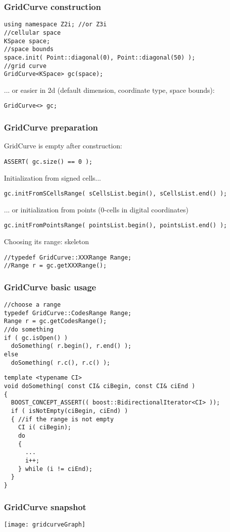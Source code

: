 
\begin{frame}[containsverbatim]
  \frametitle{GridCurve construction}

  \begin{lstlisting}
using namespace Z2i; //or Z3i
//cellular space
KSpace space;                 
//space bounds
space.init( Point::diagonal(0), Point::diagonal(50) );
//grid curve 
GridCurve<KSpace> gc(space); 
  \end{lstlisting}
... or easier in 2d (default dimension, coordinate type, space bounds): 
  \begin{lstlisting}
GridCurve<> gc; 
  \end{lstlisting}

\end{frame}


\begin{frame}[containsverbatim]
  \frametitle{GridCurve preparation}

GridCurve is empty after construction: 
  \begin{lstlisting}
ASSERT( gc.size() == 0 ); 
  \end{lstlisting}

Initialization from signed cells... 
  \begin{lstlisting}
gc.initFromSCellsRange( sCellsList.begin(), sCellsList.end() ); 
  \end{lstlisting}

... or initialization from points ($0$-cells in digital coordinates)
  \begin{lstlisting}
gc.initFromPointsRange( pointsList.begin(), pointsList.end() ); 
  \end{lstlisting}

Choosing its range: skeleton 
  \begin{lstlisting}
//typedef GridCurve::XXXRange Range; 
//Range r = gc.getXXXRange();
  \end{lstlisting}


\end{frame}

\begin{frame}[containsverbatim]
  \frametitle{GridCurve basic usage}

  \begin{lstlisting}
//choose a range
typedef GridCurve::CodesRange Range; 
Range r = gc.getCodesRange();
//do something 
if ( gc.isOpen() ) 
  doSomething( r.begin(), r.end() ); 
else 
  doSomething( r.c(), r.c() ); 
  \end{lstlisting}

  \begin{lstlisting}
template <typename CI>
void doSomething( const CI& ciBegin, const CI& ciEnd ) 
{
  BOOST_CONCEPT_ASSERT(( boost::BidirectionalIterator<CI> ));
  if ( isNotEmpty(ciBegin, ciEnd) ) 
  { //if the range is not empty
    CI i( ciBegin); 
    do 
    {
      ...
      i++;
    } while (i != ciEnd);
  }    
}
  \end{lstlisting}


\end{frame}

\begin{frame}
  \frametitle{GridCurve snapshot}

   \texttt{[image: gridcurveGraph]}

\end{frame}

